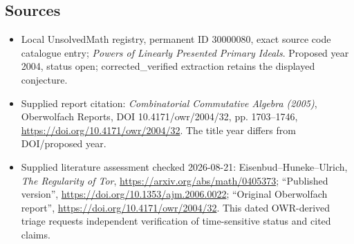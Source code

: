 \documentclass[11pt]{article}
\begin{document}
\subsection{Sources}
\begin{itemize}
\item Local UnsolvedMath registry, permanent ID 30000080, exact source code catalogue entry; \emph{Powers of Linearly Presented Primary Ideals}. Proposed year 2004, status open; corrected\_verified extraction retains the displayed conjecture.
\item Supplied report citation: \emph{Combinatorial Commutative Algebra (2005)}, Oberwolfach Reports, DOI 10.4171/owr/2004/32, pp. 1703--1746, \url{https://doi.org/10.4171/owr/2004/32}. The title year differs from DOI/proposed year.
\item Supplied literature assessment checked 2026-08-21: Eisenbud--Huneke--Ulrich, \emph{The Regularity of Tor}, \url{https://arxiv.org/abs/math/0405373}; ``Published version'', \url{https://doi.org/10.1353/ajm.2006.0022}; ``Original Oberwolfach report'', \url{https://doi.org/10.4171/owr/2004/32}. This dated OWR-derived triage requests independent verification of time-sensitive status and cited claims.
\end{itemize}
\end{document}
